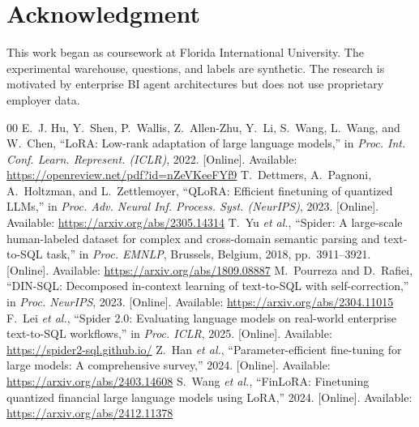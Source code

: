\documentclass[conference]{IEEEtran}
\begin{document}
\section*{Acknowledgment}
This work began as coursework at Florida International University.
The experimental warehouse, questions, and labels are synthetic. The research is motivated by enterprise BI agent architectures but does not use proprietary employer data.
\begin{thebibliography}{00}
E.~J. Hu, Y.~Shen, P.~Wallis, Z.~Allen-Zhu, Y.~Li, S.~Wang, L.~Wang, and W.~Chen, ``LoRA: Low-rank adaptation of large language models,'' in \textit{Proc. Int. Conf. Learn. Represent. (ICLR)}, 2022. [Online]. Available: \url{https://openreview.net/pdf?id=nZeVKeeFYf9}
T.~Dettmers, A.~Pagnoni, A.~Holtzman, and L.~Zettlemoyer, ``QLoRA: Efficient finetuning of quantized LLMs,'' in \textit{Proc. Adv. Neural Inf. Process. Syst. (NeurIPS)}, 2023. [Online]. Available: \url{https://arxiv.org/abs/2305.14314}
T.~Yu \textit{et al.}, ``Spider: A large-scale human-labeled dataset for complex and cross-domain semantic parsing and text-to-SQL task,'' in \textit{Proc. EMNLP}, Brussels, Belgium, 2018, pp.~3911--3921. [Online]. Available: \url{https://arxiv.org/abs/1809.08887}
M.~Pourreza and D.~Rafiei, ``DIN-SQL: Decomposed in-context learning of text-to-SQL with self-correction,'' in \textit{Proc. NeurIPS}, 2023. [Online]. Available: \url{https://arxiv.org/abs/2304.11015}
F.~Lei \textit{et al.}, ``Spider 2.0: Evaluating language models on real-world enterprise text-to-SQL workflows,'' in \textit{Proc. ICLR}, 2025. [Online]. Available: \url{https://spider2-sql.github.io/}
Z.~Han \textit{et al.}, ``Parameter-efficient fine-tuning for large models: A comprehensive survey,'' 2024. [Online]. Available: \url{https://arxiv.org/abs/2403.14608}
S.~Wang \textit{et al.}, ``FinLoRA: Finetuning quantized financial large language models using LoRA,'' 2024. [Online]. Available: \url{https://arxiv.org/abs/2412.11378}
\end{thebibliography}
\end{document}
